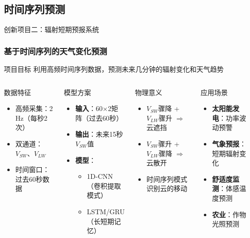\documentclass[aspectratio=169,11pt]{ctexbeamer}
\begin{document}
\subsection{时间序列预测}

\begin{frame}{创新项目二：辐射短期预报系统}
\frametitle{基于时间序列的天气变化预测}
\begin{block}{项目目标}
利用高频时间序列数据，预测未来几分钟的辐射变化和天气趋势
\end{block}

\begin{columns}
\begin{block}{数据特征}
\begin{itemize}
    \item 高频采集：2 Hz（每秒2次）
    \item 双通道：$V_{SW}$、$V_{LW}$
    \item 时间窗口：过去60秒数据
\end{itemize}
\end{block}

\begin{block}{模型方案}
\begin{itemize}
    \item \textbf{输入}：60×2矩阵（过去60秒）
    \item \textbf{输出}：未来15秒$V_{SW}$值
    \item \textbf{模型}：
    \begin{itemize}
        \item 1D-CNN（卷积提取模式）
        \item LSTM/GRU（长短期记忆）
    \end{itemize}
\end{itemize}
\end{block}

\begin{block}{物理意义}
\begin{itemize}
    \item $V_{SW}$骤降 + $V_{LW}$骤升 $\Rightarrow$ 云遮挡
    \item $V_{SW}$骤升 + $V_{LW}$骤降 $\Rightarrow$ 云散开
    \item 时间序列模式识别云的移动
\end{itemize}
\end{block}

\begin{block}{应用场景}
\begin{itemize}
    \item \textbf{太阳能发电}：功率波动预警
    \item \textbf{气象预报}：短期辐射变化
    \item \textbf{舒适度监测}：体感温度预测
    \item \textbf{农业}：作物光照预测
\end{itemize}
\end{block}
\end{columns}
\end{frame}
\end{document}
